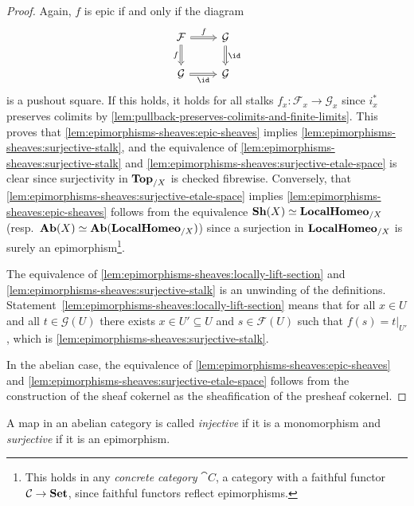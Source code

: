 \begin{proof}
Again, \(f\) is epic if and only if the diagram
\begin{equation*}
  \begin{tikzcd}[arrows=Rightarrow]
    \mathcal F \ar[r, "f"] \ar[d, "f"'] & \mathcal G \ar[d, "\id"] \\
    \mathcal G \ar[r, "\id"'] & \mathcal G
  \end{tikzcd}
\end{equation*}
is a pushout square.
If this holds, it holds for all stalks \(f_x\colon\mathcal F_x\to\mathcal G_x\) since \(i_x^*\) preserves colimits by \cref{lem:pullback-preserves-colimits-and-finite-limits}.
This proves that \cref{lem:epimorphisms-sheaves:epic-sheaves} implies \cref{lem:epimorphisms-sheaves:surjective-stalk}, and the equivalence of \cref{lem:epimorphisms-sheaves:surjective-stalk} and \cref{lem:epimorphisms-sheaves:surjective-etale-space} is clear since surjectivity in \(\mathbf{Top}_{/X}\) is checked fibrewise.
Conversely, that \cref{lem:epimorphisms-sheaves:surjective-etale-space} implies \cref{lem:epimorphisms-sheaves:epic-sheaves} follows from the equivalence \(\operatorname{\mathbf{Sh}}(X)\simeq\mathbf{LocalHomeo}_{/X}\) (resp.~\(\operatorname{\mathbf{Ab}}(X)\simeq\mathbf{Ab}(\mathbf{LocalHomeo}_{/X})\)) since a surjection in \(\mathbf{LocalHomeo}_{/X}\) is surely an epimorphism\footnote{This holds in any \emph{concrete category} \(\cat C\), a category with a faithful functor \(\mathcal{C}\to\mathbf{Set}\), since faithful functors reflect epimorphisms.}.

The equivalence of \cref{lem:epimorphisms-sheaves:locally-lift-section} and \cref{lem:epimorphisms-sheaves:surjective-stalk} is an unwinding of the definitions.
Statement~\cref{lem:epimorphisms-sheaves:locally-lift-section} means that for all \(x\in U\) and all \(t\in\mathcal G(U)\) there exists \(x\in U'\subseteq U\) and \(s\in\mathcal F(U)\) such that \(f(s) = t|_{U'}\), which is \cref{lem:epimorphisms-sheaves:surjective-stalk}.

In the abelian case, the equivalence of \cref{lem:epimorphisms-sheaves:epic-sheaves} and \cref{lem:epimorphisms-sheaves:surjective-etale-space} follows from the construction of the sheaf cokernel as the sheafification of the presheaf cokernel.
\end{proof}

\begin{defn}
A map in an abelian category is called \emph{injective} if it is a monomorphism and \emph{surjective} if it is an epimorphism.
\end{defn}

